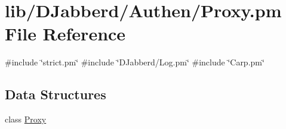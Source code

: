 \hypertarget{_authen_2_proxy_8pm}{
\section{lib/\-D\-Jabberd/\-Authen/\-Proxy.pm \-File \-Reference}
\label{_authen_2_proxy_8pm}
}
{\ttfamily \#include \char`\"{}strict.\-pm\char`\"{}}\*
{\ttfamily \#include \char`\"{}\-D\-Jabberd/\-Log.\-pm\char`\"{}}\*
{\ttfamily \#include \char`\"{}\-Carp.\-pm\char`\"{}}\*
\subsection*{\-Data \-Structures}
\begin{DoxyCompactItemize}
\item 
class \hyperlink{class_d_jabberd_1_1_authen_1_1_proxy}{\-Proxy}
\end{DoxyCompactItemize}
